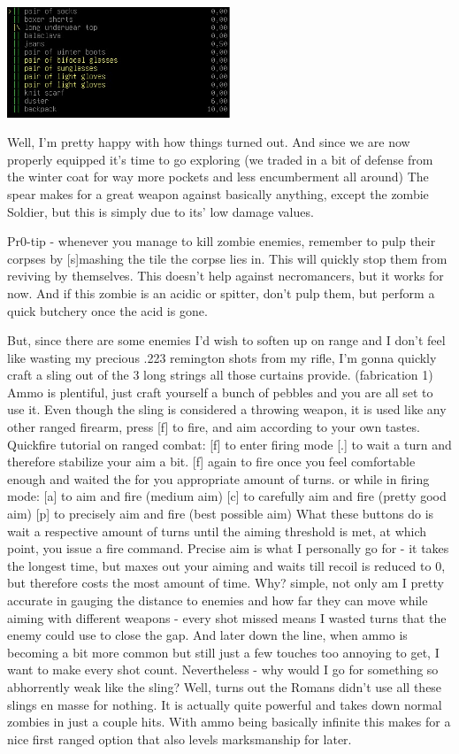 \documentclass[11pt]{report}
\begin{document}
\begin{center}
\includegraphics[width=0.5\textwidth]{12}
\end{center}

Well, I'm pretty happy with how things turned out. And since we are now properly equipped it's time to go exploring (we traded in a bit of defense from the winter coat for way more pockets and less encumberment all around) The spear makes for a great weapon against basically anything, except the zombie Soldier, but this is simply due to its' low damage values.

Pr0-tip - whenever you manage to kill zombie enemies, remember to pulp their corpses by [s]mashing the tile the corpse lies in. This will quickly stop them from reviving by themselves. This doesn't help against necromancers, but it works for now. And if this zombie is an acidic or spitter, don't pulp them, but perform a quick butchery once the acid is gone.

But, since there are some enemies I'd wish to soften up on range and I don't feel like wasting my precious .223 remington shots from my rifle, I'm gonna quickly craft a sling out of the 3 long strings all those curtains provide. (fabrication 1) Ammo is plentiful, just craft yourself a bunch of pebbles and you are all set to use it.
Even though the sling is considered a throwing weapon, it is used like any other ranged firearm, press [f] to fire, and aim according to your own tastes.
Quickfire tutorial on ranged combat:
[f] to enter firing mode
[.] to wait a turn and therefore stabilize your aim a bit.
[f] again to fire once you feel comfortable enough and waited the for you appropriate amount of turns.
or
while in firing mode:
[a] to aim and fire (medium aim)
[c] to carefully aim and fire (pretty good aim)
[p] to precisely aim and fire (best possible aim)
What these buttons do is wait a respective amount of turns until the aiming threshold is met, at which point, you issue a fire command.
Precise aim is what I personally go for - it takes the longest time, but maxes out your aiming and waits till recoil is reduced to 0, but therefore costs the most amount of time. Why? simple, not only am I pretty accurate in gauging the distance to enemies and how far they can move while aiming with different weapons - every shot missed means I wasted turns that the enemy could use to close the gap. And later down the line, when ammo is becoming a bit more common but still just a few touches too annoying to get, I want to make every shot count.
Nevertheless - why would I go for something so abhorrently weak like the sling? Well, turns out the Romans didn't use all these slings en masse for nothing. It is actually quite powerful and takes down normal zombies in just a couple hits. With ammo being basically infinite this makes for a nice first ranged option that also levels marksmanship for later.
\end{document}
